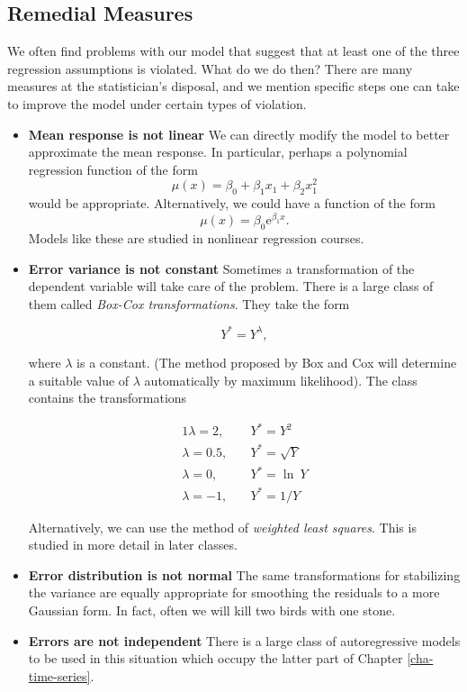 \documentclass[]{book}
\providecommand{\tightlist}{%
  \setlength{\itemsep}{0pt}\setlength{\parskip}{0pt}}
\numberwithin{equation}{chapter}
\numberwithin{figure}{chapter}
\theoremstyle{plain}
\theoremstyle{definition}
\theoremstyle{remark}
\theoremstyle{definition}
\theoremstyle{definition}
\theoremstyle{remark}
\begin{document}
\subsection{Remedial Measures}\label{remedial-measures}

We often find problems with our model that suggest that at least one of
the three regression assumptions is violated. What do we do then? There
are many measures at the statistician's disposal, and we mention
specific steps one can take to improve the model under certain types of
violation.

\begin{itemize}
\tightlist
\item
  \textbf{Mean response is not linear} We can directly modify the model
  to better approximate the mean response. In particular, perhaps a
  polynomial regression function of the form \[ \mu(x) =
   \beta_{0} + \beta_{1}x_{1} + \beta_{2}x_{1}^{2} \] would be
  appropriate. Alternatively, we could have a function of the form
  \[ \mu(x)=\beta_{0}\mathrm{e}^{\beta_{1}x}.  \] Models like these are
  studied in nonlinear regression courses.
\item
  \textbf{Error variance is not constant} Sometimes a transformation of
  the dependent variable will take care of the problem. There is a large
  class of them called \emph{Box-Cox transformations}. They take the
  form

  \begin{equation}
   Y^{\ast}=Y^{\lambda},
   \end{equation}

  where \(\lambda\) is a constant. (The method proposed by Box and Cox
  will determine a suitable value of \(\lambda\) automatically by
  maximum likelihood). The class contains the transformations

  \begin{alignat*}{1} \lambda=2,\quad &
   Y^{\ast}=Y^{2}\\ \lambda=0.5,\quad &
   Y^{\ast}=\sqrt{Y}\\ \lambda=0,\quad & Y^{\ast}=\ln\:
   Y\\ \lambda=-1,\quad & Y^{\ast}= 1/Y \end{alignat*}

  Alternatively, we can use the method of \emph{weighted least squares}.
  This is studied in more detail in later classes.
\item
  \textbf{Error distribution is not normal} The same transformations for
  stabilizing the variance are equally appropriate for smoothing the
  residuals to a more Gaussian form. In fact, often we will kill two
  birds with one stone.
\item
  \textbf{Errors are not independent} There is a large class of
  autoregressive models to be used in this situation which occupy the
  latter part of Chapter \ref{cha-time-series}.
\end{itemize}
\end{document}
